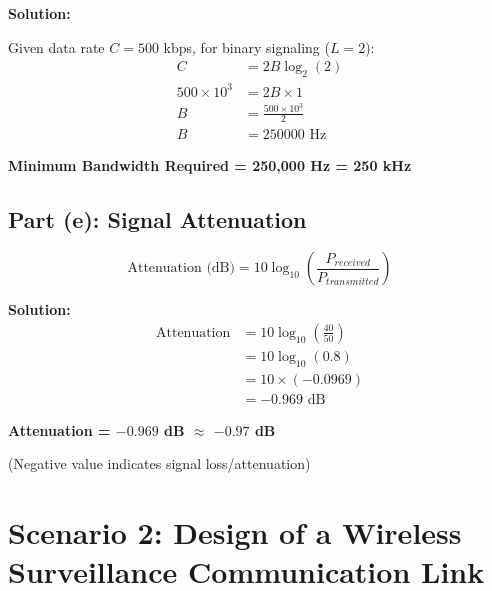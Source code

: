 \documentclass[12pt,a4paper]{article}
\begin{document}
\textbf{Solution:}

Given data rate $C = 500$ kbps, for binary signaling ($L = 2$):
\begin{align*}
C &= 2B \log_2(2) \\[1em]
500 \times 10^3 &= 2B \times 1 \\[1em]
B &= \frac{500 \times 10^3}{2} \\[1em]
B &= 250000 \text{ Hz}
\end{align*}

\begin{answerbox}
\textbf{Minimum Bandwidth Required = 250,000 Hz = 250 kHz}
\end{answerbox}

\subsection{Part (e): Signal Attenuation}

\begin{formulabox}
\[\text{Attenuation (dB)} = 10 \log_{10}\left(\frac{P_{received}}{P_{transmitted}}\right)\]
\end{formulabox}

\textbf{Solution:}
\begin{align*}
\text{Attenuation} &= 10 \log_{10}\left(\frac{40}{50}\right) \\[1em]
&= 10 \log_{10}(0.8) \\[1em]
&= 10 \times (-0.0969) \\[1em]
&= -0.969 \text{ dB}
\end{align*}

\begin{answerbox}
\textbf{Attenuation = $-0.969$ dB $\approx$ $-0.97$ dB}

(Negative value indicates signal loss/attenuation)
\end{answerbox}

\newpage

\section{Scenario 2: Design of a Wireless Surveillance Communication Link}
\end{document}
